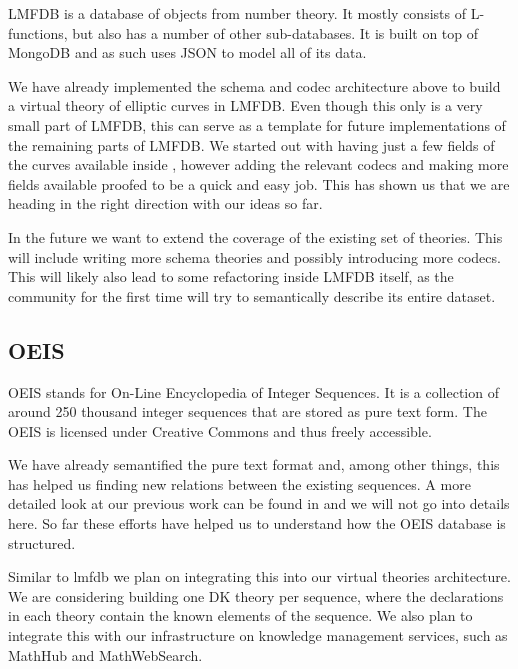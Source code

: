 LMFDB \cite{lmfdb} is a database of objects from number theory. It mostly consists of
L-functions, but also has a number of other sub-databases. It is built on top of MongoDB
and as such uses JSON to model all of its data.

We have already implemented the schema and codec architecture above to build a virtual
theory of elliptic curves in LMFDB. Even though this only is a very small part of LMFDB,
this can serve as a template for future implementations of the remaining parts of
LMFDB. We started out with having just a few fields of the curves available inside \MMT,
however adding the relevant codecs and making more fields available proofed to be a quick
and easy job. This has shown us that we are heading in the right direction with our ideas
so far.

In the future we want to extend the coverage of the existing set of theories. This will
include writing more schema theories and possibly introducing more codecs. This will
likely also lead to some refactoring inside LMFDB itself, as the community for the first
time will try to semantically describe its entire dataset.

\subsection{OEIS}

OEIS \cite{oeis} stands for On-Line Encyclopedia of Integer Sequences. It is a collection
of around 250 thousand integer sequences that are stored as pure text form. The OEIS is
licensed under Creative Commons and thus freely accessible.

We have already semantified the pure text format and, among other things, this has helped
us finding new relations between the existing sequences. A more detailed look at our
previous work can be found in \cite{LuzKoh:fsarfo16} and we will not go into details
here. So far these efforts have helped us to understand how the OEIS database is
structured.

Similar to lmfdb we plan on integrating this into our virtual theories architecture. We
are considering building one DK theory per sequence, where the declarations in each theory
contain the known elements of the sequence. We also plan to integrate this with our
infrastructure on knowledge management services, such as MathHub and MathWebSearch.



